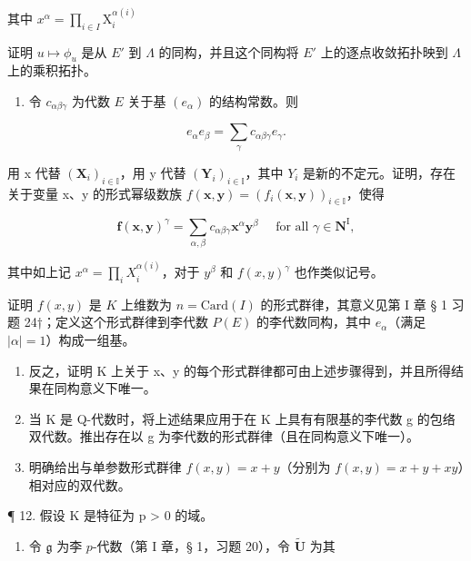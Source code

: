 其中 \(x^{\alpha} = \prod_{i\in I}\mathrm{X}_{i}^{\alpha (i)}\)

证明 \(u \mapsto \phi_u\) 是从 \(E'\) 到 \(\Lambda\) 的同构，并且这个同构将 \(E'\) 上的逐点收敛拓扑映到 \(\Lambda\) 上的乘积拓扑。

\begin{enumerate}
\def\labelenumi{(\alph{enumi})}
\setcounter{enumi}{1}
\tightlist
\item
  令 \(c_{\alpha \beta \gamma}\) 为代数 \(E\) 关于基 \((e_{\alpha})\) 的结构常数。则
\end{enumerate}

\[
e _ {\alpha} e _ {\beta} = \sum_ {\gamma} c _ {\alpha \beta \gamma} e _ {\gamma}.
\]

用 x 代替 \((\mathbf{X}_{i})_{i\in\mathbb{I}}\)，用 y 代替 \((\mathbf{Y}_{i})_{i\in\mathbb{I}}\)，其中 \(Y_{i}\) 是新的不定元。证明，存在关于变量 x、y 的形式幂级数族 \(f(\boldsymbol{x},\boldsymbol{y})=(f_{i}(\boldsymbol{x},\boldsymbol{y}))_{i\in\mathbb{I}}\)，使得

\[
\boldsymbol {f} (\boldsymbol {x}, \boldsymbol {y}) ^ {\gamma} = \sum_ {\alpha , \beta} c _ {\alpha \beta \gamma} \boldsymbol {x} ^ {\alpha} \boldsymbol {y} ^ {\beta} \quad \text { for   all } \gamma \in \mathbf {N} ^ {\mathrm{I}},
\]

其中如上记 \(x^{\alpha} = \prod_{i} X_{i}^{\alpha(i)}\)，对于 \(y^{\beta}\) 和 \(f(x, y)^{\gamma}\) 也作类似记号。

证明 \(f(x, y)\) 是 \(K\) 上维数为 \(n = \text{Card}(I)\) 的形式群律，其意义见第 I 章 § 1 习题 24†；定义这个形式群律到李代数 \(P(E)\) 的李代数同构，其中 \(e_{\alpha}\)（满足 \(|\alpha| = 1\)）构成一组基。

\begin{enumerate}
\def\labelenumi{(\alph{enumi})}
\setcounter{enumi}{2}
\item
  反之，证明 K 上关于 x、y 的每个形式群律都可由上述步骤得到，并且所得结果在同构意义下唯一。
\item
  当 K 是 Q-代数时，将上述结果应用于在 K 上具有有限基的李代数 g 的包络双代数。推出存在以 g 为李代数的形式群律（且在同构意义下唯一）。
\item
  明确给出与单参数形式群律 \(f(x, y) = x + y\)（分别为 \(f(x, y) = x + y + xy\)）相对应的双代数。
\end{enumerate}

¶ 12. 假设 K 是特征为 p > 0 的域。

\begin{enumerate}
\def\labelenumi{(\alph{enumi})}
\tightlist
\item
  令 \(\mathfrak{g}\) 为李 \(p\)-代数（第 I 章，§ 1，习题 20），令 \(\tilde{\mathbf{U}}\) 为其
\end{enumerate}


